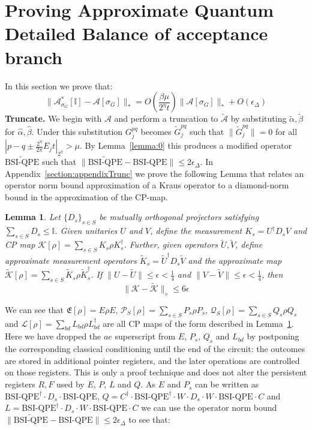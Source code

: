 \documentclass[aps,floatfix,10pt,amssymb,amsfont,amsmath,superscriptaddress,float,nofootinbib,longbibliography,nobalancelastpage,twocolumn]{revtex4-2}
\newtheorem{lemma}{Lemma}
\begin{document}
\section{Proving Approximate Quantum Detailed Balance of acceptance branch}
\label{appendix:Aproof}
In this section we prove that:
\begin{equation}
    \|\mathcal{A}^*_{\sigma_G}[\mathbb{I}] - \mathcal{A}[\sigma_G]\|_* = O\!\left(\frac{\beta\mu}{2^{\eta}t}\right)\|\mathcal{A}[\sigma_G]\|_* + O\!\left(\epsilon_{\Delta}\right)
\end{equation}
\textbf{Truncate.} We begin with $\mathcal{A}$ and perform a truncation to $\tilde{\mathcal{A}}$ by substituting $\tilde \alpha, \tilde \beta$ for $\hat \alpha, \hat \beta$. Under this substitution $G^{pq}_j$ becomes $\tilde G^{pq}_j$ such that $\|\tilde G^{pq}_j\| =0$ for all $|p-q\pm\frac{2^{\eta}}{2\pi}E_jt|_{2^{\eta}} > \mu$.  By Lemma~\ref{lemma:0} this produces a modified operator $\widetilde{\text{BSI-QPE}}$ such that $\|\widetilde{\text{BSI-QPE}}- \text{BSI-QPE}\| \leq 2\epsilon_{\Delta}$. In Appendix~\ref{section:appendixTrunc} we prove the following Lemma that relates an operator norm bound approximation of a Kraus operator to a diamond-norm bound in the approximation of the CP-map.
\begin{lemma}
\label{lemma:3}
Let $\{D_s\}_{s\in S}$ be mutually orthogonal projectors satisfying $\sum_{s\in S} D_s \leq \mathbb{I}$. Given unitaries $U$ and $V$, define the measurement $K_s = U^{\dagger}D_s V$ and CP map $\mathcal{K}[\rho] = \sum_{s \in S} K_s\rho K_s^{\dagger}$. Further, given operators $\tilde U, \tilde V$, define approximate measurement operators $\tilde K_s = \tilde U^{\dagger}D_s \tilde V$ and the approximate map $\tilde{\mathcal{K}}[\rho] = \sum_{s \in S} \tilde K_s\rho \tilde K_s^{\dagger}$. If $\|U-\tilde U\| \leq \epsilon<\frac14$ and $\|V-\tilde V\| \leq \epsilon<\frac14$, then 
\begin{equation}
    \|\mathcal{K} - \tilde{\mathcal{K}}\|_{\diamond} \leq 6\epsilon
\end{equation}
\end{lemma}
We can see that $\mathfrak{E}[\rho] =  E \rho E$, $\mathcal{P}_S[\rho] = \sum_{s\in S} P_s \rho P_s$, $\mathcal{Q}_S[\rho] = \sum_{s\in S} Q_s \rho Q_s$ and $\mathcal{L}[\rho] = \sum_{bd} L_{bd} \rho L^{\dagger}_{bd}$ are all CP maps of the form described in Lemma~\ref{lemma:3}. Here we have dropped the $ae$ superscript from $E$, $P_s$, $Q_s$ and $L_{bd}$ by postponing the corresponding classical conditioning until the end of the circuit: the outcomes are stored in additional pointer registers, and the later operations are controlled on those registers. This is only a proof technique and does not alter the persistent registers $R, F$ used by $E$, $P$, $L$ and $Q$. As $E$ and $P_s$ can be written as $\text{BSI-QPE}^{\dagger}\cdot D_s\cdot\text{BSI-QPE}$, $Q = C^{\dagger}\cdot\text{BSI-QPE}^{\dagger}\cdot W\cdot D_s\cdot W\cdot \text{BSI-QPE}\cdot C$ and $L = \text{BSI-QPE}^{\dagger}\cdot D_s\cdot W\cdot \text{BSI-QPE}\cdot C$ we can use the operator norm bound $\|\widetilde{\text{BSI-QPE}}- \text{BSI-QPE}\| \leq 2\epsilon_{\Delta}$ to see that:
\end{document}
